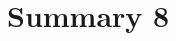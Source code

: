 \documentclass[12pt]{article} %
\begin{document}
\section{Summary 8} %



\newpage

\nocite{*}


 

\end{document}
